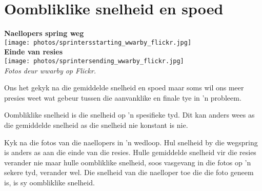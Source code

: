 \section{Oombliklike snelheid en spoed}


\begin{minipage}{.5\textwidth}
\begin{center}
\textbf{Naellopers spring weg}\\
\texttt{[image: photos/sprintersstarting\_wwarby\_flickr.jpg]}\\
\textbf{Einde van resies}\\
\texttt{[image: photos/sprintersending\_wwarby\_flickr.jpg]}\\
\textit{Fotos deur wwarby op Flickr.}
\end{center}
\end{minipage}
\begin{minipage}{.5\textwidth}

Ons het gekyk na die gemiddelde snelheid en spoed maar soms wil ons meer presies weet wat gebeur tussen die aanvanklike en finale tye in 'n probleem.

Oombliklike snelheid is die snelheid op 'n spesifieke tyd. Dit kan anders wees as die gemiddelde snelheid as die snelheid nie konstant is nie.

Kyk na die fotos van die naellopers in 'n wedloop. Hul snelheid by die wegspring is anders as aan die einde van die resies. Hulle gemiddelde snelheid vir die resies verander nie maar hulle oombliklike snelheid, soos vasgevang in die fotos op 'n sekere tyd, verander wel. Die snelheid van die naelloper toe die die foto geneem is, is sy oombliklike snelheid.

\end{minipage}

\\



